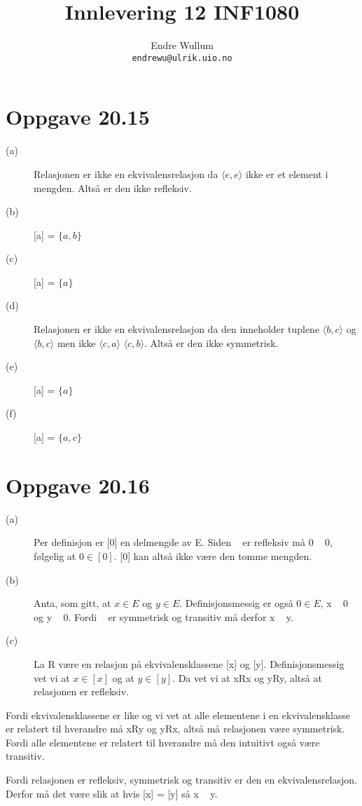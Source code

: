 \documentclass[12pt,norsk,a4paper]{article}
\title{Innlevering 12 INF1080}
\author{Endre Wullum\\ \texttt{endrewu@ulrik.uio.no}}
\begin{document}
\maketitle

\section*{Oppgave 20.15}
\begin{description}
\item[(a)]Relasjonen er ikke en ekvivalensrelasjon da $\langle e,e\rangle$ ikke er et element i mengden. Altså er den ikke refleksiv.
\item[(b)][a] = $\{a, b\}$
\item[(c)][a] = $\{a\}$
\item[(d)]Relasjonen er ikke en ekvivalensrelasjon da den inneholder tuplene $\langle b,c\rangle$ og $\langle b,c\rangle$ men ikke $\langle c,a\rangle$ $\langle c,b\rangle$. Altså er den ikke symmetrisk.
\item[(e)][a] = $\{a\}$
\item[(f)][a] = $\{a,c\}$
\end{description}

\section*{Oppgave 20.16}
\begin{description}
\item[(a)]Per definisjon er [0] en delmengde av E. Siden ~ er refleksiv må 0 ~ 0, følgelig at $0 \in [0]$. [0] kan altså ikke være den tomme mengden.
\item[(b)]Anta, som gitt, at $x \in E$ og $y \in E$. Definisjonsmessig er også $0 \in E$, x ~ 0 og y ~ 0. Fordi ~ er symmetrisk og transitiv må derfor x ~ y.
\item[(c)] La R være en relasjon på ekvivalensklassene [x] og [y]. Definisjonsmessig vet vi at $x \in [x]$ og at $y \in [y]$. Da vet vi at xRx og yRy, altså at relasjonen er refleksiv. 
\end{description}

Fordi ekvivalensklassene er like og vi vet at alle elementene i en ekvivalensklasse er relatert til hverandre må xRy og yRx, altså må relasjonen være symmetrisk. Fordi alle elementene er relatert til hverandre må den intuitivt også være transitiv.

Fordi relasjonen er refleksiv, symmetrisk og transitiv er den en ekvivalensrelasjon. Derfor må det være slik at hvis [x] = [y] så x ~ y.
\end{document}

